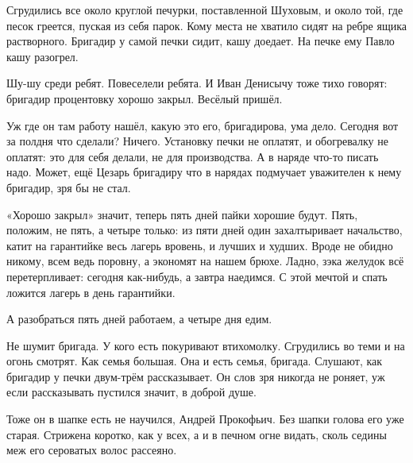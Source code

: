 Сгрудились все около круглой печурки, поставленной Шуховым, и около той, где песок греется,
пуская из себя парок. Кому места не хватило \dash сидят на ребре ящика растворного. Бригадир у
самой печки сидит, кашу доедает. На печке ему Павло кашу разогрел.

Шу-шу \dash среди ребят. Повеселели ребята. И Иван Денисычу тоже тихо говорят: бригадир
процентовку хорошо закрыл. Весёлый пришёл.

Уж где он там работу нашёл, какую \dash это его, бригадирова, ума дело. Сегодня вот за полдня что
сделали? Ничего. Установку печки не оплатят, и обогревалку не оплатят: это для себя делали, не
для производства. А в наряде что-то писать надо. Может, ещё Цезарь бригадиру что в нарядах
подмучает \dash уважителен к нему бригадир, зря бы не стал.

«Хорошо закрыл» \dash значит, теперь пять дней пайки хорошие будут. Пять, положим, не пять, а
четыре только: из пяти дней один захалтыривает начальство, катит на гарантийке весь лагерь
вровень, и лучших и худших. Вроде не обидно никому, всем ведь поровну, а экономят на нашем
брюхе. Ладно, зэка желудок всё перетерпливает: сегодня как-нибудь, а завтра наедимся. С этой
мечтой и спать ложится лагерь в день гарантийки.

А разобраться \dash пять дней работаем, а четыре дня едим.

Не шумит бригада. У кого есть \dash покуривают втихомолку. Сгрудились во теми \dash и на огонь
смотрят. Как семья большая. Она и есть семья, бригада. Слушают, как бригадир у печки двум-трём
рассказывает. Он слов зря никогда не роняет, уж если рассказывать пустился \dash значит, в
доброй душе.

Тоже он в шапке есть не научился, Андрей Прокофьич. Без шапки голова его уже старая. Стрижена
коротко, как у всех, а и в печном огне видать, сколь седины меж его сероватых волос рассеяно.

